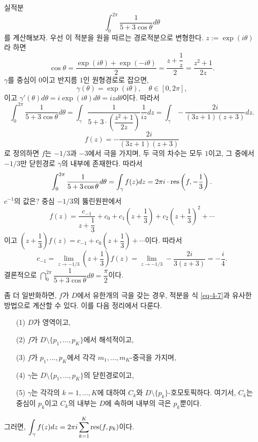 \begin{saltexample}{}{}\label{example-4-18}
실적분
\[
\int_0^{2\pi} \dfrac1{5 + 3\cos\theta} d\theta
\]
를 계산해보자.
우선 이 적분을 원을 따르는 경로적분으로 변형한다.
$z:=\exp(i\theta)$라 하면
\[
\cos\theta = \dfrac{\exp(i\theta) + \exp(-i\theta)}2 
= \dfrac{z+ \dfrac1z}2 = \dfrac{z^2+1}{2z}.
\]
$\gamma$를 중심이 $0$이고 반지름 $1$인 원형경로로 잡으면,
\[
\gamma(\theta) = \exp(i\theta), \quad \theta \in [0,2\pi],
\]
이고 $\gamma'(\theta) d\theta = i\exp(i\theta)d\theta = izd\theta$이다.
따라서
\[
\int_0^{2\pi} \dfrac1{5 + 3\cos\theta} d\theta
= \int_\gamma \dfrac1{5+3\cdot\left(\dfrac{z^2+1}{2z}\right)}
\dfrac1{iz}dz
= \int_\gamma - \dfrac{2i}{(3z+1)(z+3)}dz.
\]
\[
f(z) = - \dfrac{2i}{(3z+1)(z+3)}
\]
로 정의하면 $f$는 $-1/3$과 $-3$에서 극을 가지며,
두 극의 차수는 모두 $1$이고,
그 중에서 $-1/3$만 닫힌경로 $\gamma$의 내부에 존재한다.
따라서
\[
\int_0^{2\pi} \displaystyle\frac1{5 + 3\cos\theta} d\theta
= \int_\gamma f(z)dz = 2\pi i \cdot \mathop{\mathrm{res}}\left(f, -\displaystyle\frac13\right).
\]
$c^{-1}$의 값은? 중심 $-1/3$의 뚫린원판에서
\[
f(z) = \dfrac{c_{-1}}{z+ \dfrac13} + c_0 + c_1\left(z + \dfrac13\right)
+ c_2\left(z+\dfrac13\right)^2 + \cdots
\]
이고 $\left(z+\dfrac13\right) f(z) = c_{-1} + c_0\left(z + \dfrac13\right) + \cdots$이다.
따라서
\[
c_{-1} = \lim_{z\to -1/3} \left(z+\dfrac13\right) f(z)
= \lim_{z\to -1/3} - \dfrac{2i}{3(z+3)} = - \dfrac i4.
\]
결론적으로 $\dint_0^{2\pi} \dfrac1{5 + 3\cos\theta} d\theta = \dfrac\pi2$이다.
\end{saltexample}

좀 더 일반화하면, $f$가 $D$에서 유한개의 극을 갖는 경우,
적분을 식 \eqref{eq-4-7}과 유사한 방법으로 계산할 수 있다.
이를 다음 정리에서 다룬다.

\begin{salttheorem} [유수정리] {}{} \label{thm-4-11}

\begin{itemize}
\item[(1)] $D$가 영역이고,
\item[(2)] $f$가 $D\setminus \{p_1, \ldots, p_K\}$에서 해석적이고,
\item[(3)] $f$가 $p_1, \ldots, p_K$에서 각각 $m_1, \ldots, m_K$-중극을 가지며,
\item[(4)] $\gamma$는 $D\setminus \{p_1, \ldots, p_K\}$의 닫힌경로이고,
\item[(5)] $\gamma$는 각각의 $k=1,\ldots, K$에 대하여
$C_k$와 $D\setminus\{p_k\}$-호모토픽하다.
여기서, $C_k$는 중심이 $p_k$이고 $C_k$의 내부는 $D$에 속하며 
내부의 극은 $p_k$뿐이다.
\end{itemize}
그러면, $\displaystyle\int_\gamma f(z)dz = 2\pi i \sum\limits_{k=1}^K \mathop{\mathrm{res}}(f,p_k)$이다.
\end{salttheorem}

